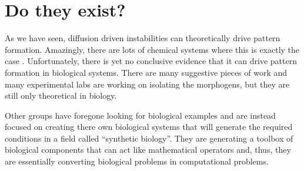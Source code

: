 \section{Do they exist?}
As we have seen, diffusion driven instabilities can theoretically drive pattern formation. Amazingly, there are lots of chemical systems where this is exactly the case . Unfortunately, there is yet no conclusive evidence that it can drive pattern formation in biological systems. There are many suggestive pieces of work and many experimental labs are working on isolating the morphogens, but they are still only theoretical in biology. 

Other groups have foregone looking for biological examples and are instead focused on creating there own biological systems that will generate the required conditions in a field called ``synthetic biology''. They are generating a toolbox of biological components that can act like mathematical operators and, thus, they are essentially converting biological problems in computational problems. 
